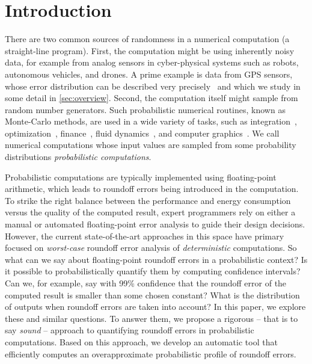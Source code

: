 \section{Introduction}
\label{sec:introduction}

There are two common sources of randomness in a numerical computation (a
straight-line program). First, the computation might be using inherently noisy data, for example from analog sensors in cyber-physical systems such as robots, autonomous vehicles, and
drones.  A prime example is data from GPS sensors, whose error distribution can be described very precisely~\cite{bornholt2014uncertain} and which we study in some detail in \cref{sec:overview}.
Second, the computation itself might sample from random number
generators. Such probabilistic numerical routines, known as Monte-Carlo
methods, are used in a wide variety of tasks, such as integration~\cite{press1990recursive,lepage1980vegas},
optimization~\cite{press1988numerical}, finance~\cite{glasserman2013monte}, fluid
dynamics~\cite{landau2014guide}, and computer graphics~\cite{kajiya1986rendering}.  We call
 numerical computations whose input values are sampled from
some probability distributions \emph{probabilistic computations}.  


Probabilistic computations are typically implemented using
floating-point arithmetic, which leads to roundoff errors being introduced in
the computation. To strike the right balance between the performance
and energy consumption versus the quality of the computed result, expert
programmers rely on either a manual or automated floating-point error analysis
to guide their design decisions. However, the current state-of-the-art
approaches in this space have primary focused on \emph{worst-case} roundoff error
analysis of \emph{deterministic} computations.  So what can we say about
floating-point roundoff errors in a probabilistic context? Is it possible to
probabilistically quantify them by computing confidence intervals?  Can we, for
example, say with 99\% confidence that the roundoff error of the computed
result is smaller than some chosen constant?  What is the distribution of
outputs when roundoff errors are taken into account? In this paper, we explore these and similar questions.  To answer them, we propose a rigorous -- that is to say \emph{sound} -- approach to quantifying
roundoff errors in probabilistic computations. Based on this
approach, we develop an automatic tool that efficiently computes an overapproximate
probabilistic profile of roundoff errors.

